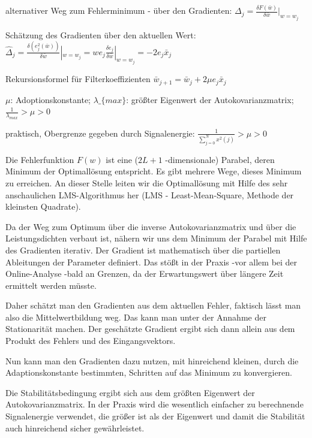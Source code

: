 \documentclass[a4paper]{article}
\begin{document}
\begin{multicols}{3}
  \begin{itemize*}
    \item alternativer Weg zum Fehlerminimum - über den Gradienten: $\Delta_j=\frac{\delta F(\bar{w})}{\delta \bar{w}}|_{w=w_j}$
    \item Schätzung des Gradienten über den aktuellen Wert: $\hat{\Delta}_j=\frac{\delta(e_j^2(\bar{w}))}{\delta \bar{w}}|_{w=w_j} =we_j \frac{\delta e_j}{\delta \bar{w}}|_{w=w_j}=-2e_j \bar{x}_j$
    \item Rekursionsformel für Filterkoeffizienten $\bar{w}_{j+1}=\bar{w}_j + 2\mu e_j \bar{x}_j$
    \item $\mu$: Adoptionskonstante; $\lambda\_\{max\}$: größter Eigenwert der Autokovarianzmatrix; $\frac{1}{\lambda_{max}}>\mu >0$
    \item praktisch, Obergrenze gegeben durch Signalenergie: $\frac{1}{\sum_{j=0}^N x^2(j)}>\mu >0$
    \item Die Fehlerfunktion $F(w)$ ist eine ($2L+1$ -dimensionale) Parabel, deren Minimum der Optimallösung entspricht. Es gibt mehrere Wege, dieses Minimum zu erreichen. An dieser Stelle leiten wir die Optimallösung mit Hilfe des sehr anschaulichen LMS-Algorithmus her (LMS - Least-Mean-Square, Methode der kleinsten Quadrate).
    \item Da der Weg zum Optimum über die inverse Autokovarianzmatrix und über die Leistungsdichten verbaut ist, nähern wir uns dem Minimum der Parabel mit Hilfe des Gradienten iterativ. Der Gradient ist mathematisch über die partiellen Ableitungen der Parameter definiert. Das stößt in der Praxis -vor allem bei der Online-Analyse -bald an Grenzen, da der Erwartungswert über längere Zeit ermittelt werden müsste.
    \item Daher schätzt man den Gradienten aus dem aktuellen Fehler, faktisch lässt man also die Mittelwertbildung weg. Das kann man unter der Annahme der Stationarität machen. Der geschätzte Gradient ergibt sich dann allein aus dem Produkt des Fehlers und des Eingangsvektors.
    \item Nun kann man den Gradienten dazu nutzen, mit hinreichend kleinen, durch die Adaptionskonstante bestimmten, Schritten auf das Minimum zu konvergieren.
    \item Die Stabilitätsbedingung ergibt sich aus dem größten Eigenwert der Autokovarianzmatrix. In der Praxis wird die wesentlich einfacher zu berechnende Signalenergie verwendet, die größer ist als der Eigenwert und damit die Stabilität auch hinreichend sicher gewährleistet.
  \end{itemize*}


\end{multicols}
\end{document}
